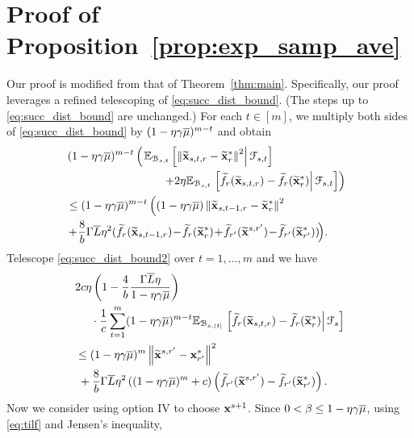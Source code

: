 \documentclass[10pt,twocolumn,journal]{IEEEtran}
\begin{document}
\section{Proof of Proposition~\ref{prop:exp_samp_ave} }\label{sec:proof_exp_ave}
Our proof is modified from that of Theorem~\ref{thm:main}. Specifically, our proof leverages a refined telescoping of \eqref{eq:succ_dist_bound}. (The steps up to \eqref{eq:succ_dist_bound} are unchanged.)
For each $t\in[m]$, we multiply both sides of \eqref{eq:succ_dist_bound} by $(1-\eta\gamma\overline{\mu})^{m-t}$ and obtain
\begin{align}
&\hspace{-.2cm}(1-\eta\gamma\barmu)^{m-t}\left(\left.\bbE_{\calB_{s,t}}\left[\norm{\tilbx_{s,t,r}-\tilbx_r^*}^2\right\vert\calF_{s,t}\right]\right.\nn\\
&\hspace{-.25cm}\left.\hspace{3cm}+2\eta\bbE_{\calB_{s,t}}\left.\left[\tilf_r (\tilbx_{s,t,r})-\tilf_r (\tilbx_{r}^*)\right\vert\calF_{s,t}\right]\right) \nn\\
&\hspace{-.25cm}\le(1-\eta\gamma\barmu)^{m-t}\left((1-\eta\gamma\barmu)\norm{\tilbx_{s,t-1,r} - \tilbx_r^*}^2\right. \nn\\
&\hspace{-.25cm}+\!\frac{8}{b}\Gamma\barL\eta^2(\tilf_r(\tilbx_{s,t-1,r})\!-\!\tilf_r(\tilbx_r^*)\!+\!\tilf_{r'}(\tilbx^{s,{r'}})\!-\!\tilf_{r'}(\tilbx_{r'}^*))\!\Big).  \label{eq:succ_dist_bound2}
\end{align}
Telescope \eqref{eq:succ_dist_bound2} over $t=1,\ldots,m$ and we have
\begin{align}
&2c\eta\left(1-\frac{4}{b}\frac{\Gamma\overline{L}\eta}{1-\eta\gamma\overline{\mu}}\right)\nonumber\\
&\hspace{.5cm}\cdot\frac{1}{c}\sum_{t=1}^m(1-\eta\gamma\overline{\mu})^{m-t}\mathbb{E}_{\mathcal{B}_{s,(t]}}\left.\left[\widetilde{f}_r(\widetilde{\mathbf{x}}_{s,t,r})-\widetilde{f}_r(\widetilde{\mathbf{x}}^*_{r})\right\vert\mathcal{F}_{s}\right]\nonumber\\
&\le(1-\eta\gamma\overline{\mu})^{m}\left\Vert\widetilde{\mathbf{x}}^{s,r'}-\mathbf{x}_{r'}^*\right\Vert^2\nonumber\\
&\;+\frac{8}{b}\Gamma\overline{L}\eta^2\left((1-\eta\gamma\overline{\mu})^{m}+c\right)\left(\widetilde{f}_{r'}(\widetilde{\mathbf{x}}^{s,r'})-\widetilde{f}_{r'}(\widetilde{\mathbf{x}}_{r'}^*)\right).\label{eq:telescoped_uniform2}
\end{align}
Now we consider using option IV to choose $\mathbf{x}^{s+1}$. 
Since $0<\beta\le 1-\eta\gamma\overline{\mu}$, using \eqref{eq:tilf} and Jensen's inequality, %
\end{document}
